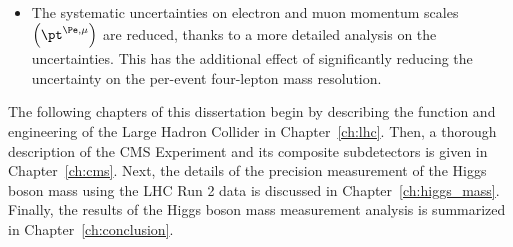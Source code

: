 \begin{itemize}
    \item The systematic uncertainties on electron and muon momentum scales $\left( \pt^{\Pe, \mu} \right)$ are reduced, thanks to a more detailed analysis on the uncertainties.
    This has the additional effect of significantly reducing the uncertainty on the per-event four-lepton mass resolution.
\end{itemize}

The following chapters of this dissertation begin by describing the function and engineering of the Large Hadron Collider in Chapter~\ref{ch:lhc}.
Then, a thorough description of the CMS Experiment and its composite subdetectors is given in Chapter~\ref{ch:cms}.
Next, the details of the precision measurement of the Higgs boson mass using the LHC Run 2 data is discussed in Chapter~\ref{ch:higgs_mass}.
Finally, the results of the Higgs boson mass measurement analysis is summarized in Chapter~\ref{ch:conclusion}.











